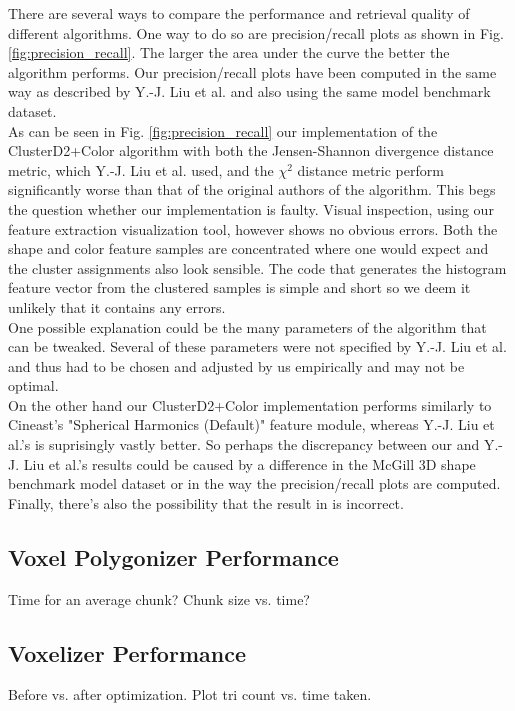 There are several ways to compare the performance and retrieval quality of different algorithms. One way to do so are precision/recall plots as shown in Fig. \ref{fig:precision_recall}. The larger the area under the
curve the better the algorithm performs. Our precision/recall plots have been computed in the same way as described by Y.-J. Liu et al. \cite{cluster_d2_color} and also using the same model benchmark dataset.\\
As can be seen in Fig. \ref{fig:precision_recall} our implementation of the ClusterD2+Color algorithm with both the Jensen-Shannon divergence distance metric, which Y.-J. Liu et al. used,
and the $\chi^2$ distance metric perform significantly worse than that of the original authors of the algorithm. This begs the question whether our implementation is faulty. Visual inspection, using our feature
extraction visualization tool, however shows no obvious errors. Both the shape and color feature samples are concentrated where one would expect and the cluster assignments also look sensible. The code that generates
the histogram feature vector from the clustered samples is simple and short so we deem it unlikely that it contains any errors.\\
One possible explanation could be the many parameters of the algorithm that can be tweaked. Several of these parameters were not specified by Y.-J. Liu et al. and thus had to be chosen and adjusted by us empirically
and may not be optimal.\\
On the other hand our ClusterD2+Color implementation performs similarly to Cineast's "Spherical Harmonics (Default)" feature module, whereas Y.-J. Liu et al.'s is suprisingly vastly better.
So perhaps the discrepancy between our and Y.-J. Liu et al.'s results could be caused by a difference in the McGill 3D shape benchmark model dataset \cite{mcgill_shape_benchmark} or in the way the precision/recall plots are computed. Finally, there's also the possibility that the result in \cite{cluster_d2_color} is incorrect.


\subsection{Voxel Polygonizer Performance}
Time for an average chunk? Chunk size vs. time?

\subsection{Voxelizer Performance}
Before vs. after optimization. Plot tri count vs. time taken.

